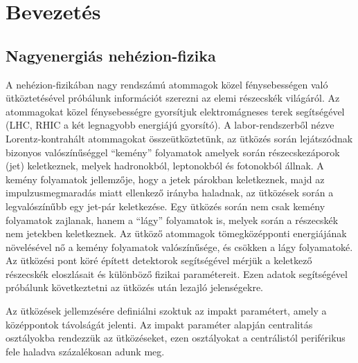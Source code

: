 \documentclass[10pt,a4paper]{article}
\numberwithin{equation}{subsection}
\numberwithin{figure}{section}
\begin{document}
\newpage
\tableofcontents

\clearpage
\pagestyle{plain}
\setcounter{page}{1}



\section{Bevezetés}

\subsection{Nagyenergiás nehézion-fizika}



A nehézion-fizikában nagy rendszámú atommagok közel fénysebességen való ütköztetésével próbálunk információt szerezni az elemi részecskék világáról. Az atommagokat közel fénysebességre gyorsítjuk elektromágneses terek segítségével (LHC, RHIC a két legnagyobb energiájú gyorsító). A labor-rendszerből nézve Lorentz-kontrahált atommagokat összeütköztetünk,  az ütközés során lejátszódnak bizonyos valószínűséggel ``kemény'' folyamatok amelyek során részecskezáporok (jet) keletkeznek, melyek hadronokból, leptonokból és fotonokból állnak. A kemény folyamatok jellemzője, hogy a jetek párokban keletkeznek, majd az impulzusmegmaradás miatt ellenkező irányba haladnak, az ütközések során a legvalószínűbb egy jet-pár keletkezése. Egy ütközés során nem csak kemény folyamatok zajlanak, hanem a ``lágy'' folyamatok is, melyek során a részecskék nem jetekben keletkeznek. Az ütköző atommagok tömegközépponti energiájának növelésével nő a kemény folyamatok valószínűsége, és csökken a lágy folyamatoké. Az ütközési pont köré épített detektorok segítségével mérjük a keletkező részecskék eloszlásait és különböző fizikai paramétereit. Ezen adatok segítségével próbálunk következtetni az ütközés után lezajló jelenségekre.

Az ütközések jellemzésére definiálni szoktuk az impakt paramétert, amely a középpontok távolságát jelenti. Az impakt paraméter alapján centralitás osztályokba rendezzük az ütközéseket, ezen osztályokat a centrálistól periférikus fele haladva százalékosan adunk meg.
\end{document}
